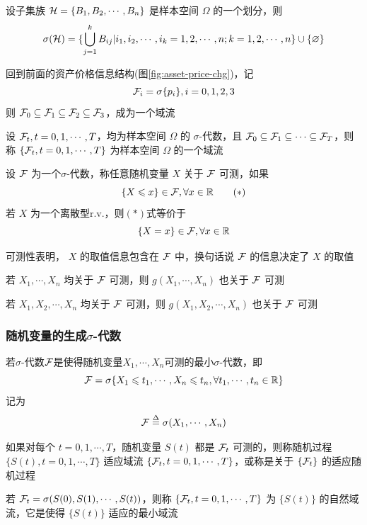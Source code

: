 \begin{example}
    设子集族 $\mathcal{H}=\{B_1,B_2,\cdots,B_n\}$ 是样本空间 $\Omega$ 的一个划分，则
    \[
    \sigma(\mathcal{H})=\{\bigcup_{j=1}^k B_{ij}|i_1,i_2,\cdots,i_k=1,2,\cdots,n;k=1,2,\cdots,n\}\cup \{\varnothing\}
    \]
\end{example}

回到前面的资产价格信息结构(图\ref{fig:asset-price-chg})，记
\[
\mathcal{F}_i=\sigma\{p_i\},i=0,1,2,3
\]
则 $\mathcal{F}_0\subseteq \mathcal{F}_1\subseteq \mathcal{F}_2\subseteq \mathcal{F}_3$，成为一个域流

\begin{definition}[域流]
    设 $\mathcal{F}_t,t=0,1,\cdots,T$，均为样本空间 $\Omega$ 的 $\sigma$-代数，且 $\mathcal{F}_0\subseteq \mathcal{F}_1\subseteq \cdots\subseteq \mathcal{F}_T$，则称 $\{\mathcal{F}_t,t=0,1,\cdots,T\}$ 为样本空间 $\Omega$ 的一个域流
\end{definition}

\begin{definition}[可测性]
    设 $\mathcal{F}$ 为一个$\sigma$-代数，称任意随机变量 $X$ 关于 $\mathcal{F}$ 可测，如果
    \[
    \{X\leqslant x\}\in \mathcal{F},\forall x\in \mathbb{R}\tag{$*$}
    \]
    若 $X$ 为一个离散型r.v.，则$(*)$式等价于
    \[
        \{X= x\}\in \mathcal{F},\forall x\in \mathbb{R}
    \]
\end{definition}

可测性表明， $X$ 的取值信息包含在 $\mathcal{F}$ 中，换句话说 $\mathcal{F}$ 的信息决定了 $X$ 的取值

\begin{property}
若 $X_1,\cdots,X_n$ 均关于 $\mathcal{F}$ 可测，则 $g(X_1,\cdots,X_n)$ 也关于 $\mathcal{F}$ 可测
\end{property}

\begin{property}
    若 $X_1,X_2,\cdots,X_n$ 均关于 $\mathcal{F}$ 可测，则 $g(X_1,X_2,\cdots,X_n)$ 也关于 $\mathcal{F}$ 可测
\end{property}

\subsubsection{随机变量的生成$\sigma$-代数}

若$\sigma$-代数$\mathcal{F}$是使得随机变量$X_1,\cdots,X_n$可测的最小$\sigma$-代数，即
\[
\mathcal{F}=\sigma\{X_1\leqslant t_1,\cdots ,X_n\leqslant t_n,\forall t_1,\cdots,t_n\in \mathbb{R}\}
\]
记为
\[
\mathcal{F}\overset{\Delta}{=}\sigma(X_1,\cdots,X_n)
\]

\begin{definition}[适应域流]
    如果对每个 $t=0,1,\cdots,T$，随机变量 $S(t)$ 都是 $\mathcal{F}_t$ 可测的，则称随机过程 $\{S(t),t=0,1,\cdots,T\}$ 适应域流 $\{\mathcal{F}_t,t=0,1,\cdots,T\}$，或称是关于 $\{\mathcal{F}_t\}$ 的适应随机过程
\end{definition}

\begin{definition}[自然域流]
    若 $\mathcal{F}_t=\sigma(S(0),S(1),\cdots,S(t))$，则称 $\{\mathcal{F}_t,t=0,1,\cdots,T\}$ 为 $\{S(t)\}$ 的自然域流，它是使得 $\{S(t)\}$ 适应的最小域流
\end{definition}
